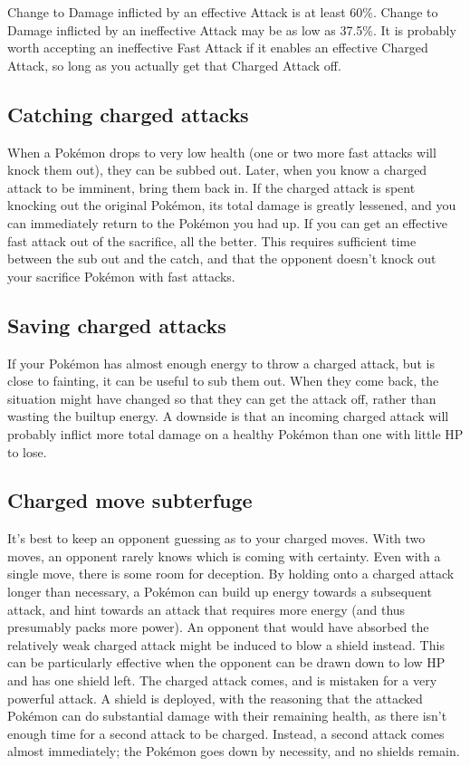 Change to Damage inflicted by an effective Attack is at least 60\%.
Change to Damage inflicted by an ineffective Attack may be as
 low as 37.5\%.
It is probably worth accepting an ineffective Fast Attack if it
 enables an effective Charged Attack, so long as you actually
 get that Charged Attack off.

\subsection{Catching charged attacks}
When a Pokémon drops to very low health (one or two more fast attacks will knock
 them out), they can be subbed out.
Later, when you know a charged attack to be imminent, bring them back in.
If the charged attack is spent knocking out the original Pokémon, its total
 damage is greatly lessened, and you can immediately return to the Pokémon
 you had up.
If you can get an effective fast attack out of the sacrifice, all the better.
This requires sufficient time between the sub out and the catch, and that the
 opponent doesn't knock out your sacrifice Pokémon with fast attacks.

\subsection{Saving charged attacks}
If your Pokémon has almost enough energy to throw a charged attack, but is close to fainting, it can be useful to sub them out.
When they come back, the situation might have changed so that they can get the attack off,
 rather than wasting the builtup energy.
A downside is that an incoming charged attack will probably inflict more total
 damage on a healthy Pokémon than one with little HP to lose.

\subsection{Charged move subterfuge}
It's best to keep an opponent guessing as to your charged moves.
With two moves, an opponent rarely knows which is coming with certainty.
Even with a single move, there is some room for deception.
By holding onto a charged attack longer than necessary, a Pokémon can build
  up energy towards a subsequent attack, and hint towards an attack
  that requires more energy (and thus presumably packs more power).
An opponent that would have absorbed the relatively weak charged attack
  might be induced to blow a shield instead.
This can be particularly effective when the opponent can be drawn down to low HP
  and has one shield left.
The charged attack comes, and is mistaken for a very powerful attack.
A shield is deployed, with the reasoning that the attacked Pokémon can
  do substantial damage with their remaining health, as there isn't
  enough time for a second attack to be charged.
Instead, a second attack comes almost immediately; the Pokémon goes
  down by necessity, and no shields remain.

